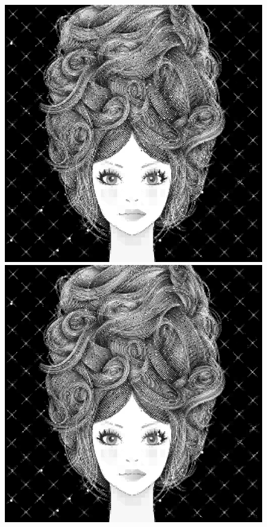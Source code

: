 \documentclass[11pt,a4paper,appendixprefix=true,numbers=noenddot]{scrreprt}
\begin{document}
\begin{figure}[!ht]
\includegraphics[scale=0.35]{images/girl05}
\includegraphics[scale=0.35]{images/girl06}

\end{figure}
\end{document}
